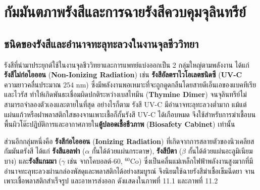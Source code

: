 \chapter{กัมมันตภาพรังสีและการฉายรังสีควบคุมจุลินทรีย์}

\section{ชนิดของรังสีและอำนาจทะลุทะลวงในงานจุลชีววิทยา}


รังสีที่นำมาประยุกต์ใช้ในงานจุลชีววิทยาและการแพทย์แบ่งออกเป็น 2 กลุ่มใหญ่ตามพลังงาน ได้แก่ \textbf{รังสีไม่ก่อไอออน} (\textbf{Non-Ionizing Radiation}) เช่น \textbf{รังสีอัลตราไวโอเลตชนิดซี} (\textbf{UV-C} ความยาวคลื่นประมาณ $254\text{ nm}$) ซึ่งมีพลังงานพอเหมาะที่จะถูกดูดกลืนโดยสายดีเอ็นเอของแบคทีเรียและไวรัส ทำให้เกิดพันธะเชื่อมผิดปกติระหว่างเบสไทมีน (\textbf{Thymine Dimer}) จนจุลินทรีย์ไม่สามารถจำลองตัวเองและตายในที่สุด อย่างไรก็ตาม รังสี UV-C มีอำนาจทะลุทะลวงต่ำมาก แม้แต่แผ่นแก้วหรือฝาพลาสติกใสของจานเพาะเชื้อก็กั้นรังสี UV-C ได้เกือบหมด จึงใช้สำหรับการฆ่าเชื้อบนพื้นผิวโต๊ะปฏิบัติการและอากาศภายใน\textbf{ตู้ปลอดเชื้อชีวภาพ} (\textbf{Biosafety Cabinet}) เท่านั้น

ส่วนอีกกลุ่มหนึ่งคือ \textbf{รังสีก่อไอออน} (\textbf{Ionizing Radiation}) ที่เกิดจากการสลายตัวของนิวเคลียสกัมมันตรังสี ได้แก่ \textbf{รังสีแอลฟา} ($\alpha$ กั้นได้ด้วยแผ่นกระดาษ), \textbf{รังสีบีตา} ($\beta$ กั้นได้ด้วยแผ่นอะลูมิเนียมบาง) และ\textbf{รังสีแกมมา} ($\gamma$ เช่น จากโคบอลต์-60, $^{60}\text{Co}$) ซึ่งเป็นคลื่นแม่เหล็กไฟฟ้าพลังงานสูงมากที่มีอำนาจทะลุทะลวงผ่านกล่องพัสดุและพลาสติกได้อย่างสมบูรณ์ จึงนิยมใช้ฉายรังสีฆ่าเชื้อเข็มฉีดยา จานเพาะเชื้อพลาสติกสำเร็จรูป และอาหารส่งออก ดังแสดงใน\mbox{ภาพที่} 11.1 และ\mbox{ภาพที่} 11.2

